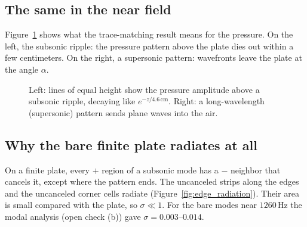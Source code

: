 \subsection{The same in the near field}
Figure~\ref{fig:near_far} shows what the trace-matching result means for the
pressure. On the left, the subsonic ripple: the pressure pattern above the plate
dies out within a few centimeters. On the right, a supersonic pattern: wavefronts
leave the plate at the angle $\alpha$.

\begin{figure}[htbp]
\centering
{}
\caption{Left: lines of equal height show the pressure amplitude above a subsonic
ripple, decaying like $e^{-z/4.6\,\mathrm{cm}}$. Right: a long-wavelength
(supersonic) pattern sends plane waves into the air.}
\label{fig:near_far}
\end{figure}

\subsection{Why the bare finite plate radiates at all}
On a finite plate, every $+$ region of a subsonic mode has a $-$ neighbor that
cancels it, except where the pattern ends. The uncanceled strips along the edges
and the uncanceled corner cells radiate (Figure~\ref{fig:edge_radiation}). Their
area is small compared with the plate, so $\sigma \ll 1$. For the bare modes near
$1260\,\mathrm{Hz}$ the modal analysis (open check (b)) gave
$\sigma = 0.003$--$0.014$.


